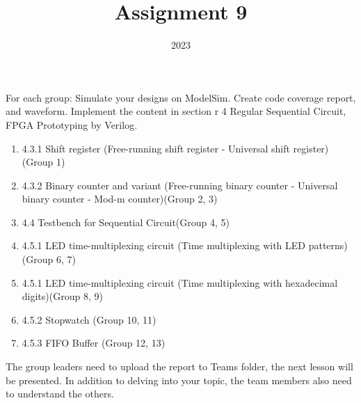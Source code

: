 \documentclass{vhdl-assignment}
\title{Assignment 9}
\date{2023}
\begin{document}
\maketitle
\thispagestyle{fancy}

For each group: Simulate your designs on ModelSim. Create code coverage report, and waveform.
Implement the content in section r 4 Regular
Sequential Circuit, FPGA Prototyping by Verilog.

\begin{enumerate}
    \item 4.3.1 Shift register (Free-running shift register - Universal shift register) (Group 1)
    \item 4.3.2 Binary counter and variant (Free-running binary counter - Universal binary counter - Mod-m counter)(Group 2, 3)
    \item 4.4 Testbench for Sequential Circuit(Group 4, 5)
    \item 4.5.1 LED time-multiplexing circuit (Time multiplexing with LED patterns)(Group 6, 7)
    \item 4.5.1 LED time-multiplexing circuit (Time multiplexing with hexadecimal digits)(Group 8, 9)
    \item 4.5.2 Stopwatch (Group 10, 11)
    \item 4.5.3 FIFO Buffer (Group 12, 13)
\end{enumerate}

The group leaders need to upload the report to Teams folder, the next lesson will be presented.
In addition to delving into your topic, the team members also need to understand the others.
\end{document}
